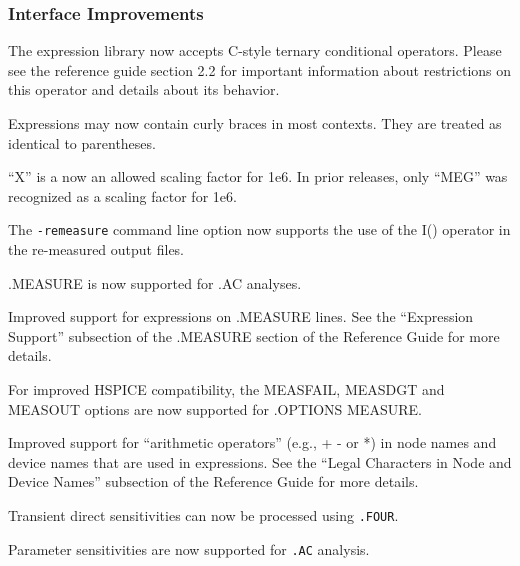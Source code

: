 \documentclass[letterpaper]{scrartcl}
\begin{document}
\subsubsection*{Interface Improvements}
\begin{XyceItemize}
\item The \Xyce{} expression library now accepts C-style ternary
  conditional operators.  Please see the reference guide section 2.2
  for important information about restrictions on this operator and
  details about its behavior.
\item Expressions may now contain curly braces in most contexts.  They
  are treated as identical to parentheses.
\item ``X'' is a now an allowed scaling factor for 1e6.  In prior \Xyce{}
  releases, only ``MEG'' was recognized as a scaling factor for 1e6.
\item The \texttt{-remeasure} command line option now supports the use 
of the I() operator in the re-measured output files.
\item .MEASURE is now supported for .AC analyses.
\item Improved support for expressions on .MEASURE lines.  See the ``Expression
Support'' subsection of the .MEASURE section of the \Xyce{} Reference Guide 
for more details.
\item For improved HSPICE compatibility, the MEASFAIL, MEASDGT and MEASOUT
options are now supported for .OPTIONS MEASURE.
\item Improved support for ``arithmetic operators'' (e.g., + - or *) in node names
and device names that are used in expressions. See the ``Legal Characters in Node
and Device Names'' subsection of the \Xyce{} Reference Guide for more details.
\item Transient direct sensitivities can now be processed using \texttt{.FOUR}.
\item Parameter sensitivities are now supported for \texttt{.AC} analysis.
\end{XyceItemize}
\end{document}
